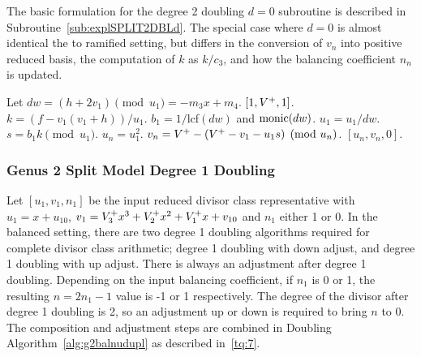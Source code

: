 The basic formulation for the degree 2 doubling $d = 0$ subroutine is described
in Subroutine~\ref{sub:explSPLIT2DBLd}. The special case where $d=0$ is almost
identical the to ramified setting, but differs in the conversion of $v_n$
into positive reduced basis, the computation of $k$ as $k/c_3$, and how the
balancing coefficient $n_n$ is updated. 

\begin{subroutine}[htbp]
\caption{Genus 2 Split Model Degree 2 Doubling ($d = 0$)\label{sub:explSPLIT2DBLd}}
\begin{algorithmic} [1]
\State Let $dw = (h + 2v_1) \pmod{u_1} = -m_3x + m_4.$
 \hspace{1pt} \Return $[1,V^{+},1]$.
\Else
    \State $k = (f - v_1(v_1 + h))/u_1$.
    \State $b_1 = 1/$lcf$(dw)$ and $\operatorname{monic}(dw)$.
    \State $u_1 = u_1/dw$.
    \State $s = b_1k \pmod{u_1}$.
    \State $u_n = u_1^2$.
    \State $v_n = V^{+} - (V^{+} - v_1 - u_1s) \pmod{u_n}$.
    \State \Return $[u_n,v_n,0]$.
\EndIf
\end{algorithmic}
\end{subroutine}
 




\subsubsection{Genus 2 Split Model Degree 1 Doubling}
Let $[u_1,v_1,n_1]$ be the input reduced divisor class representative with $u_1
= x + u_{10}$, $v_1 = V^{+}_3x^3 + V^{+}_2x^2 + V^{+}_1x + v_{10}$ and $n_1$ either 1
or 0. In the balanced setting, there are two degree 1 doubling algorithms
required for complete divisor class arithmetic; degree 1 doubling with down
adjust, and degree 1 doubling with up adjust. There is always an adjustment
after degree 1 doubling. Depending on the input balancing coefficient, if $n_1$
is 0 or 1, the resulting $n = 2n_1 - 1$ value is -1 or 1 respectively. The
degree of the divisor after degree 1 doubling is 2, so an adjustment up or down
is required to bring $n$ to 0. The composition and adjustment steps are combined
in Doubling Algorithm~\ref{alg:g2balnudupl} as described in~\ref{tq:7}. 

